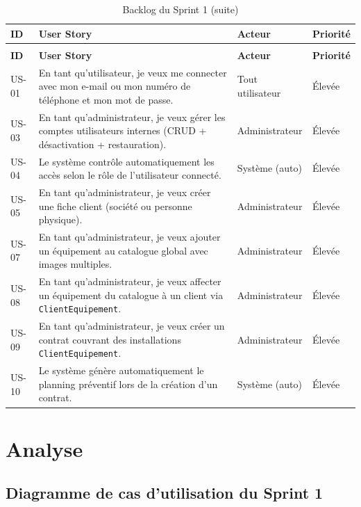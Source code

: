 \begin{longtable}{|p{1.2cm}|p{7.5cm}|p{2.8cm}|p{1.8cm}|}
\caption{Backlog du Sprint 1}
\label{tab:ch3:backlog_sprint1} \\
\hline
\textbf{ID} & \textbf{User Story} & \textbf{Acteur} & \textbf{Priorité} \\
\hline
\endfirsthead
\caption*{Backlog du Sprint 1 (suite)} \\
\hline
\textbf{ID} & \textbf{User Story} & \textbf{Acteur} & \textbf{Priorité} \\
\hline
\endhead
\hline
\endfoot
\hline
\endlastfoot
US-01 & En tant qu'utilisateur, je veux me connecter avec mon e-mail ou mon numéro de téléphone et mon mot de passe. & Tout utilisateur & Élevée \\
\hline
US-03 & En tant qu'administrateur, je veux gérer les comptes utilisateurs internes (CRUD + désactivation + restauration). & Administrateur & Élevée \\
\hline
US-04 & Le système contrôle automatiquement les accès selon le rôle de l'utilisateur connecté. & Système (auto) & Élevée \\
\hline
US-05 & En tant qu'administrateur, je veux créer une fiche client (société ou personne physique). & Administrateur & Élevée \\
\hline
US-07 & En tant qu'administrateur, je veux ajouter un équipement au catalogue global avec images multiples. & Administrateur & Élevée \\
\hline
US-08 & En tant qu'administrateur, je veux affecter un équipement du catalogue à un client via \texttt{ClientEquipement}. & Administrateur & Élevée \\
\hline
US-09 & En tant qu'administrateur, je veux créer un contrat couvrant des installations \texttt{ClientEquipement}. & Administrateur & Élevée \\
\hline
US-10 & Le système génère automatiquement le planning préventif lors de la création d'un contrat. & Système (auto) & Élevée \\
\hline
\end{longtable}

\section{Analyse}

\subsection{Diagramme de cas d'utilisation du Sprint 1}

